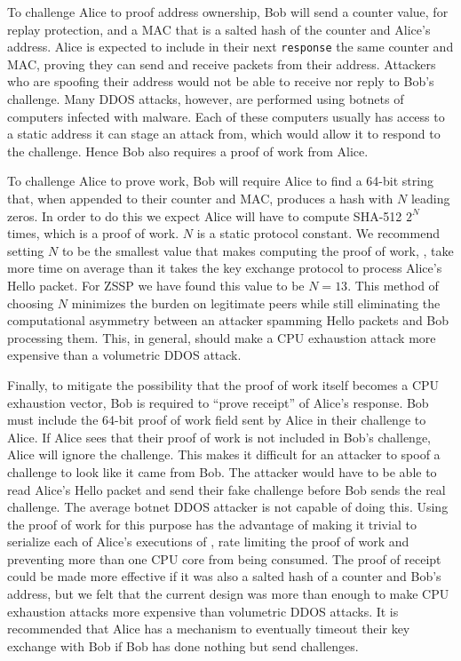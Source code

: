 \documentclass{article}
\begin{document}
To challenge Alice to proof address ownership, Bob will send a counter value, for replay protection, and a MAC that is a salted hash of the counter and Alice's address. Alice is expected to include in their next \texttt{response} the same counter and MAC, proving they can send and receive packets from their address. Attackers who are spoofing their address would not be able to receive nor reply to Bob's challenge. Many DDOS attacks, however, are performed using botnets of computers infected with malware. Each of these computers usually has access to a static address it can stage an attack from, which would allow it to respond to the challenge. Hence Bob also requires a proof of work from Alice.

To challenge Alice to prove work, Bob will require Alice to find a 64-bit string that, when appended to their counter and MAC, produces a hash with $N$ leading zeros. In order to do this we expect Alice will have to compute SHA-512 $2^N$ times, which is a proof of work. $N$ is a static protocol constant. We recommend setting $N$ to be the smallest value that makes computing the proof of work, , take more time on average than it takes the key exchange protocol to process Alice's Hello packet. For ZSSP we have found this value to be $N=13$. This method of choosing $N$ minimizes the burden on legitimate peers while still eliminating the computational asymmetry between an attacker spamming Hello packets and Bob processing them. This, in general, should make a CPU exhaustion attack more expensive than a volumetric DDOS attack.

Finally, to mitigate the possibility that the proof of work itself becomes a CPU exhaustion vector, Bob is required to ``prove receipt'' of Alice's response. Bob must include the 64-bit proof of work field sent by Alice in their challenge to Alice. If Alice sees that their proof of work is not included in Bob's challenge, Alice will ignore the challenge. This makes it difficult for an attacker to spoof a challenge to look like it came from Bob. The attacker would have to be able to read Alice's Hello packet and send their fake challenge before Bob sends the real challenge. The average botnet DDOS attacker is not capable of doing this. Using the proof of work for this purpose has the advantage of making it trivial to serialize each of Alice's executions of , rate limiting the proof of work and preventing more than one CPU core from being consumed. The proof of receipt could be made more effective if it was also a salted hash of a counter and Bob's address, but we felt that the current design was more than enough to make CPU exhaustion attacks more expensive than volumetric DDOS attacks. It is recommended that Alice has a mechanism to eventually timeout their key exchange with Bob if Bob has done nothing but send challenges.
\end{document}
